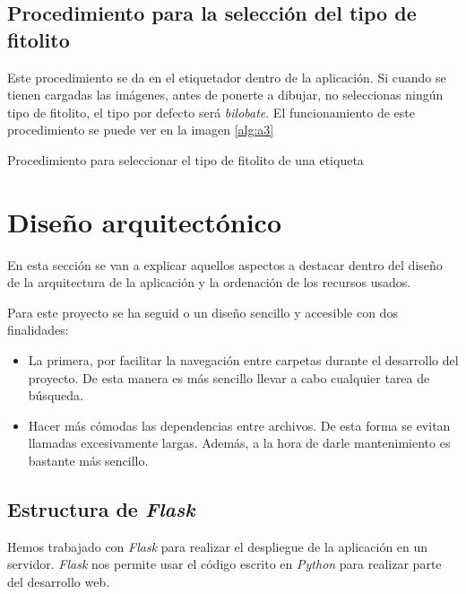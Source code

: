\subsection{Procedimiento para la selección del tipo de fitolito}

Este procedimiento se da en el etiquetador dentro de la aplicación.
Si cuando se tienen cargadas las imágenes, antes de ponerte a dibujar, no seleccionas ningún tipo de fitolito, el tipo por defecto será \textit{bilobate}.
El funcionamiento de este procedimiento se puede ver en la imagen \ref{alg:a3}

\begin{algorithm}

		{
		}
		
	\caption{Procedimiento para seleccionar el tipo de fitolito de una etiqueta}
	\label{alg:a3}
\end{algorithm}
\section{Diseño arquitectónico}

En esta sección se van a explicar aquellos aspectos a destacar dentro del diseño de la arquitectura de la aplicación y la ordenación de los recursos usados.

Para este proyecto se ha seguid
o un diseño sencillo y accesible con dos finalidades:

\begin{itemize}
	\item La primera, por facilitar la navegación entre carpetas durante el desarrollo del proyecto. De esta manera es más sencillo llevar a cabo cualquier tarea de búsqueda.
	
	\item Hacer más cómodas las dependencias entre archivos. De esta forma se evitan llamadas excesivamente largas. Además, a la hora de darle mantenimiento es bastante más sencillo.
\end{itemize}

\subsection{Estructura de \textit{Flask}}

Hemos trabajado con \textit{Flask} para realizar el despliegue de la aplicación en un servidor. \textit{Flask} nos permite usar el código escrito en \textit{Python} para realizar parte del desarrollo web.

